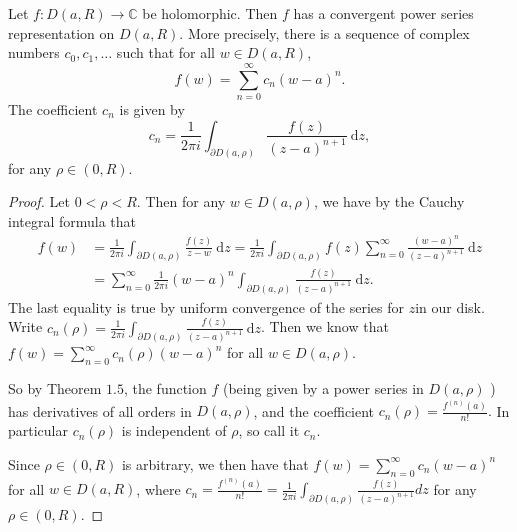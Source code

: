 \documentclass[egregdoesnotlikesansseriftitles,a4paper]{scrartcl}
\begin{document}
\begin{theorem}
      Let $f: D \left(a,R\right) \rightarrow \mathbb{C}$ be holomorphic. Then $f$ has a convergent power series representation on $D \left(a,R\right)$. More precisely, there is a sequence of complex numbers $c_0 , c_1 , \ldots$ such that for all $w \in D \left(a,R\right)$, \[
      f \left(w\right)=\sum_{n=0}^{\infty}c_{n} \left(w-a\right)^{n}
      .\] The coefficient $c_{n}$ is given by \[
      c_{n}=\frac{1}{2\pi i}\int_{\partial D \left(a,\rho \right)}^{} \frac{f \left(z\right)}{\left(z-a\right)^{n+1}} \ \mathrm{d}z 
      ,\] for any $\rho \in \left(0,R\right)$.
      \begin{proof}
          Let $0<\rho <R$. Then for any $w \in D \left(a,\rho \right)$, we have by the Cauchy integral formula that 
          \begin{align*}
               f \left(w\right)&=\frac{1}{2\pi i} \int_{\partial D \left(a,\rho \right)}^{} \frac{f \left(z\right)}{z-w} \ \mathrm{d}z = \frac{1}{2\pi i} \int_{\partial D \left(a,\rho \right)}^{} f \left(z\right)\sum_{n=0}^{\infty} \frac{\left(w-a\right)^{n}}{\left(z-a\right)^{n+1}} \ \mathrm{d}z\\
               &= \sum_{n=0}^{\infty}\frac{1}{2\pi i} \left(w-a\right)^{n}\int_{\partial D \left(a,\rho \right)}^{} \frac{f \left(z\right)}{\left(z-a\right)^{n+1}} \ \mathrm{d}z.
          \end{align*}
          The last equality is true by uniform convergence of the series for $z$in our disk. Write $c_{n}\left(\rho \right)=\frac{1}{2\pi i}\int_{\partial D \left(a,\rho \right)}^{} \frac{f \left(z\right)}{\left(z-a\right)^{n+1}} \ \mathrm{d}z$. Then we know that $f \left(w\right)=\sum_{n=0}^{\infty}c_{n}\left(\rho \right) \left(w-a\right)^{n}$ for all $w \in D \left(a,\rho \right)$.
    
          So by Theorem $1.5$, the function $f$ (being given by a power series in $D(a, \rho)$ ) has derivatives of all orders in $D(a, \rho)$, and the coefficient $c_{n}(\rho)=\frac{f^{(n)}(a)}{n !} .$ In particular $c_{n}(\rho)$ is independent of $\rho$, so call it $c_{n}$.
    
         Since $\rho \in(0, R)$ is arbitrary, we then have that $f(w)=\sum_{n=0}^{\infty} c_{n}(w-a)^{n}$ for all $w \in D(a, R)$, where $c_{n}=\frac{f^{(n)}(a)}{n !}=\frac{1}{2 \pi i} \int_{\partial D(a, \rho)} \frac{f(z)}{(z-a)^{n+1}} d z$ for any $\rho \in(0, R)$.
    \end{proof}
\end{theorem}
\end{document}
